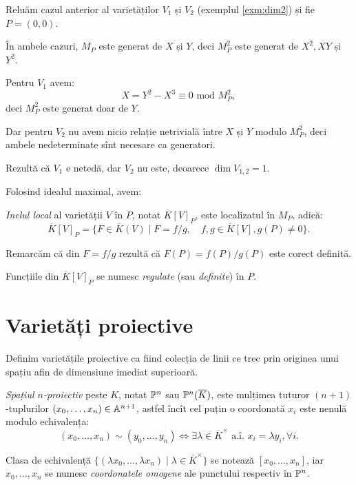 \begin{example}\label{exm:nesing}
  Reluăm cazul anterior al varietăților $ V_1 $ și $ V_2 $ (exemplul \ref{exm:dim2}) și
  fie $ P = (0, 0) $.

  În ambele cazuri, $ M_P $ este generat de $ X $ și $ Y $, deci $ M_P^2 $ este generat de
  $ X^2, XY $ și $ Y^2 $.

  Pentru $ V_1 $ avem:
  \[
    X = Y^2 - X^3 \equiv 0 \text{ mod } M_P^2,
  \]
  deci $ M_P^2 $ este generat doar de $ Y $.

  Dar pentru $ V_2 $ nu avem nicio relație netrivială între $ X $ și $ Y $ modulo $ M_P^2 $, deci
  ambele nedeterminate sînt necesare ca generatori.

  Rezultă că $ V_1 $ e netedă, dar $ V_2 $ nu este, deoarece $ \dim V_{1,2} = 1 $.
\end{example}

Folosind idealul maximal, avem:
\begin{definition}\label{def:inel-local}
  \emph{Inelul local} al varietății $ V $ în $ P $, notat $ \overline{K}[V]_P $, este localizatul
  în $ M_P $, adică:
  \[
    \overline{K}[V]_P = \{ F \in \overline{K}(V) \mid F = f/g, \quad f,g \in \overline{K}[V], g(P) \neq 0 \}.
  \]
\end{definition}

Remarcăm că din $ F = f/g $ rezultă că $ F(P) = f(P)/g(P) $ este corect definită.

Funcțiile din $ \overline{K}[V]_P $ se numesc \emph{regulate} (sau \emph{definite}) în $ P $.


\section{Varietăți proiective}

Definim varietățile proiective ca fiind colecția de linii ce trec prin originea
unui spațiu afin de dimensiune imediat superioară.

\begin{definition}\label{def:spatiu-proiectiv}
  \emph{Spațiul $ n $-proiectiv} peste $ K $, notat $ \mathbb{P}^n $ sau $ \mathbb{P}^n(\overline{K}) $,
  este mulțimea tuturor $ (n + 1) $-tuplurilor $ (x_0, \dots, x_n) \in \mathbb{A}^{n + 1} $,
  astfel încît cel puțin o coordonată $ x_i $ este nenulă modulo echivalența:
  \[
    (x_0, \dots, x_n) \sim (y_0, \dots, y_n) \Leftrightarrow \exists \lambda %
    \in \overline{K}^\times \text{ a.\^{i}. } x_i = \lambda y_i, \forall i.
  \]

  Clasa de echivalență
  $ \{(\lambda x_0, \dots, \lambda x_n) \mid \lambda \in \overline{K}^\times \} $
  se notează $ [x_0, \dots, x_n] $, iar $ x_0, \dots, x_n $ se numesc \emph{coordonatele %
  omogene} ale punctului respectiv în $ \mathbb{P}^n $.
\end{definition}

